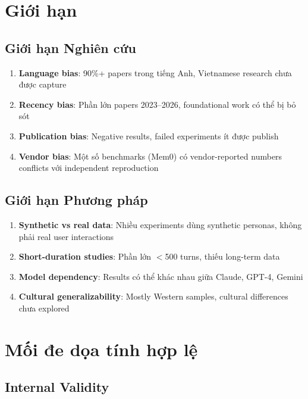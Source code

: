 \documentclass[10pt,leqno]{amsart}
\begin{document}
\section{Giới hạn}

\subsection{Giới hạn Nghiên cứu}

\begin{enumerate}
    \item \textbf{Language bias}: 90\%+ papers trong tiếng Anh, Vietnamese research chưa được capture
    \item \textbf{Recency bias}: Phần lớn papers 2023--2026, foundational work có thể bị bỏ sót
    \item \textbf{Publication bias}: Negative results, failed experiments ít được publish
    \item \textbf{Vendor bias}: Một số benchmarks (Mem0) có vendor-reported numbers conflicts với independent reproduction
\end{enumerate}

\subsection{Giới hạn Phương pháp}

\begin{enumerate}
    \item \textbf{Synthetic vs real data}: Nhiều experiments dùng synthetic personas, không phải real user interactions
    \item \textbf{Short-duration studies}: Phần lớn $<$500 turns, thiếu long-term data
    \item \textbf{Model dependency}: Results có thể khác nhau giữa Claude, GPT-4, Gemini
    \item \textbf{Cultural generalizability}: Mostly Western samples, cultural differences chưa explored
\end{enumerate}


\section{Mối đe dọa tính hợp lệ}

\subsection{Internal Validity}
\end{document}
